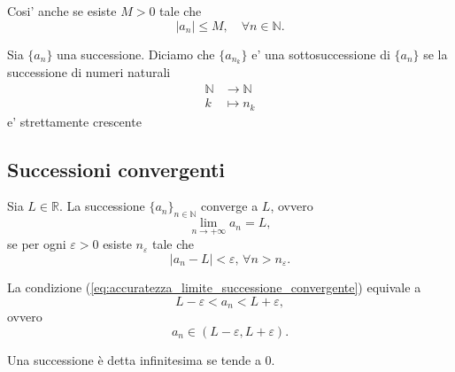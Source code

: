 Cosi' anche se esiste $M>0$ tale che
\begin{equation*}
    |a_n|\leq M,\quad \forall n\in\mathbb N.
\end{equation*}

\begin{definition}[Sottosucessione]\label{def:sottosuccessione}
    Sia $\{a_n\}$ una successione. Diciamo che $\{a_{n_k}\}$ e' una
    sottosuccessione di $\{a_n\}$ se la successione di numeri naturali
    \begin{equation*}
        \begin{aligned}
            \mathbb N &\rightarrow\mathbb N\\
            k &\mapsto n_k
        \end{aligned}
    \end{equation*}
    e' strettamente crescente
\end{definition}

\subsection{Successioni convergenti}
\begin{definition}
    Sia $L\in\mathbb R$. La successione $\{a_n\}_{n\in\mathbb N}$ converge a $L$, ovvero
    \begin{equation*}
        \lim_{n\rightarrow+\infty}a_n=L,
    \end{equation*}
    se per ogni $\varepsilon>0$ esiste $n_\varepsilon$ tale che
    \begin{equation}\label{eq:accuratezza_limite_successione_convergente}
        |a_n-L|<\varepsilon,\,\forall n>n_\varepsilon.
    \end{equation}
\end{definition}

\begin{remark}\label{rem:successione_convergente_limitata}
    La condizione (\ref{eq:accuratezza_limite_successione_convergente}) equivale a
    \begin{equation*}
        L-\varepsilon < a_n < L+\varepsilon,
    \end{equation*}
    ovvero
    \begin{equation*}
        a_n\in(L-\varepsilon,L+\varepsilon).
    \end{equation*}
\end{remark}

\begin{definition}
    Una successione è detta infinitesima se tende a 0.
\end{definition}

